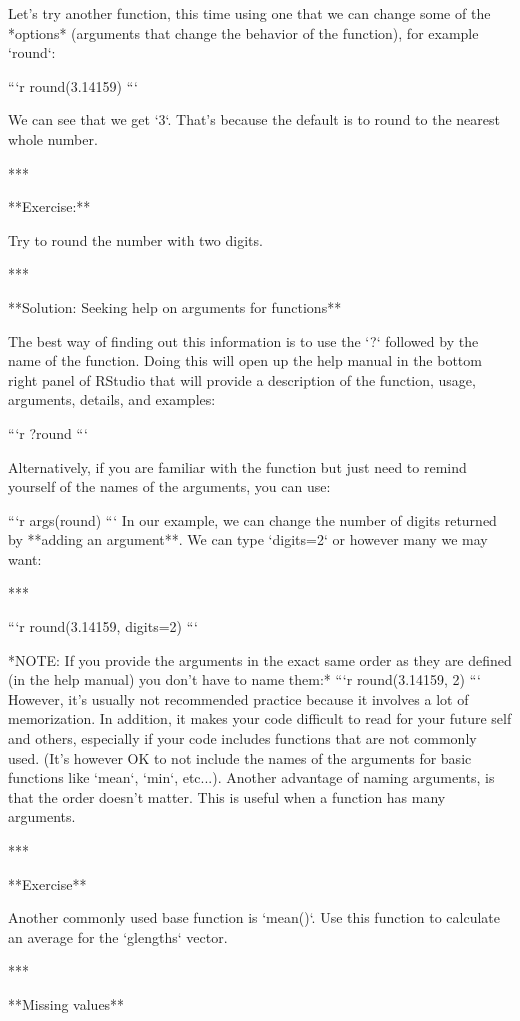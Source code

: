 {{Let's try another function, this time using one that we can change some of the *options* (arguments that change the behavior of the function), for example `round`:

```r
round(3.14159)
```

We can see that we get `3`. That's because the default is to round to the nearest whole number. 

***

**Exercise:** 

Try to round the number with two digits.

***

**Solution: Seeking help on arguments for functions**

The best way of finding out this information is to use the `?` followed by the name of the function. Doing this will open up the help manual in the bottom right panel of RStudio that will provide a description of the function, usage, arguments, details, and examples: 

```r
?round
```	

Alternatively, if you are familiar with the function but just need to remind yourself of the names of the arguments, you can use:

```r
args(round)
```
In our example, we can change the number of digits returned by **adding an argument**. We can type `digits=2` or however many we may want:

***

```r
round(3.14159, digits=2)
```

*NOTE: If you provide the arguments in the exact same order as they are defined (in the help manual) you don't have to name them:*
```r
round(3.14159, 2)
```
However, it's usually not recommended practice because it involves a lot of memorization. In addition, it makes your code difficult to read for your future self and others, especially if your code includes functions that are not commonly used. (It's however OK to not include the names of the arguments for basic functions like `mean`, `min`, etc...). Another advantage of naming arguments, is that the order doesn't matter. This is useful when a function has many arguments. 

***

**Exercise** 

Another commonly used base function is `mean()`. Use this function to calculate an average for the `glengths` vector.


***

**Missing values** 

}}

